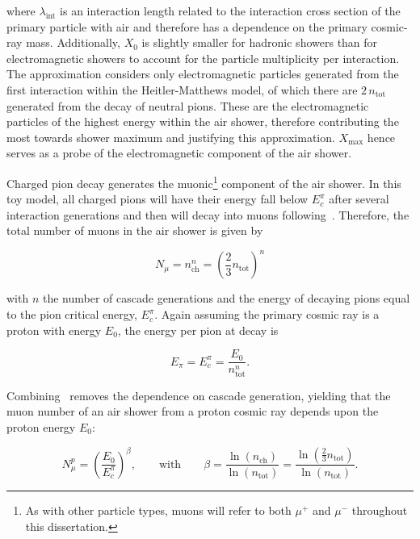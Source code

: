 \noindent
where $\lambda_{\text{int}}$ is an interaction length related to the interaction cross section of the primary particle with air and therefore has a dependence on the primary cosmic-ray mass.
Additionally, $X_{0}$ is slightly smaller for hadronic showers than for electromagnetic showers to account for the particle multiplicity per interaction.
The approximation considers only electromagnetic particles generated from the first interaction within the Heitler-Matthews model, of which there are $2\,n_{\text{tot}}$ generated from the decay of neutral pions.
These are the electromagnetic particles of the highest energy within the air shower, therefore contributing the most towards shower maximum and justifying this approximation.
$X_{\text{max}}$ hence serves as a probe of the electromagnetic component of the air shower.

Charged pion decay generates the muonic\footnote[6]{As with other particle types, muons will refer to both $\mu^{+}$ and $\mu^{-}$ throughout this dissertation.} component of the air shower.
In this toy model, all charged pions will have their energy fall below $E_{c}^{\pi}$ after several interaction generations and then will decay into muons following~.
Therefore, the total number of muons in the air shower is given by

\begin{equation}
    N_{\mu} = n_{\text{ch}}^{n} = \left( \frac{2}{3} n_{\text{tot}} \right)^{n} \label{eq:muon_pion_relation}
\end{equation}

\noindent
with $n$ the number of cascade generations and the energy of decaying pions equal to the pion critical energy, $E_{c}^{\pi}$.
Again assuming the primary cosmic ray is a proton with energy $E_{0}$, the energy per pion at decay is

\begin{equation}
    E_{\pi} = E_{c}^{\pi} = \frac{E_{0}}{n_{\text{tot}}^{n}}. \label{eq:energy_per_pion}
\end{equation}

\noindent
Combining~ removes the dependence on cascade generation, yielding that the muon number of an air shower from a proton cosmic ray depends upon the proton energy $E_{0}$:

\begin{equation}
    N_{\mu}^{p} = \left( \frac{E_{0}}{E_{c}^{\pi}} \right)^{\beta}, \qquad \text{with} \qquad \beta = \frac{\ln\left( n_{\text{ch}} \right)}{\ln\left( n_{\text{tot}} \right)} = \frac{\ln\left( \frac{2}{3} n_{\text{tot}} \right)}{\ln\left( n_{\text{tot}} \right)}. \label{eq:proton_nmu}
\end{equation}

